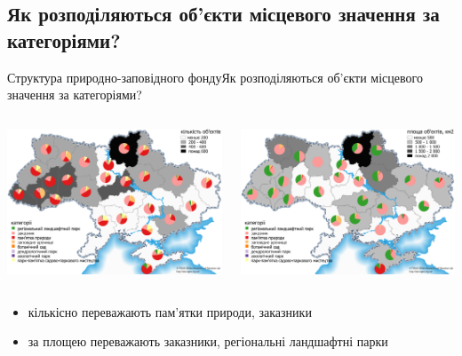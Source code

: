 \documentclass[12pt, aspectratio=1610]{beamer}
\begin{document}
\subsection{Як розподіляються об'єкти місцевого значення за категоріями?}
\begin{frame}{Структура природно-заповідного фонду}{Як розподіляються об'єкти місцевого значення за категоріями?}
	\begin{columns}[c]
		
		
		\includegraphics[width=\textwidth]{./figures/local_categories_count.png}%
		
		
		\includegraphics[width=\textwidth]{./figures/local_categories_area.png}
		
	\end{columns}
\begin{itemize}
	\item кількісно переважають пам'ятки природи, заказники
	\item за площею переважають  заказники, регіональні ландшафтні парки
\end{itemize}
\end{frame}
\end{document}
